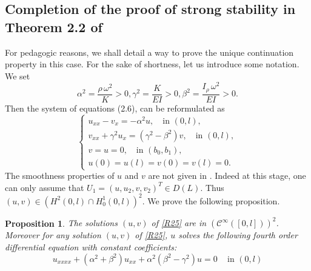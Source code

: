 \documentclass[10pt, english]{article}
\newtheorem{prop}[thm]{Proposition}
\begin{document}
{\subsection{Completion of the proof of strong stability in Theorem 2.2 of \cite{SW2003}}
For pedagogic reasons, we shall detail a way to prove the unique continuation property in this case. For the sake of shortness, let us introduce some notation. We set
\begin{equation}\label{R24}%
\alpha^2= \dfrac{\rho\, \omega^2}{K} >0,
\gamma^2= \dfrac{K}{EI} >0,
\beta^2= \dfrac{I_{\rho}\, \omega^2}{EI}>0.
\end{equation}
Then the system of equations (2.6), can be reformulated as
\begin{equation}\label{R25}%
\begin{cases}
u_{xx} -v_x=-\alpha^2 u, \quad \mbox{in } (0,l),\\
v_{xx} +\gamma^2u_x=(\gamma^2 - \beta^2) v, \quad \mbox{in } (0,l),\\
v=u=0, \quad \mbox{in } (b_0,b_1),\\
u(0)=u(l)=v(0)=v(l)=0.
\end{cases}
\end{equation}
The smoothness properties of $u$ and $v$ are not given in \cite{SW2003}. Indeed at this stage, one can only assume that $U_1=(u, u_2,v,v_2)^T \in D(L)$. Thus $(u,v) \in (H^2(0,l) \cap H^1_0(0,l))^2$. 
We prove the following proposition.
\begin{prop}\label{Prop1}
The solutions $(u,v)$ of \eqref{R25} are in $(\mathcal{C}^{\infty}([0,l]))^2$. Moreover for any solution $(u,v)$ of \eqref{R25}, $u$ solves the following fourth order differential equation with constant coefficients:
\begin{equation}\label{R26}%
u_{xxxx} + (\alpha^2+\beta^2)u_{xx} + \alpha^2(\beta^2 - \gamma^2)u=0\, \quad \mbox{in } (0,l)
\end{equation}


\end{prop}}
\end{document}
